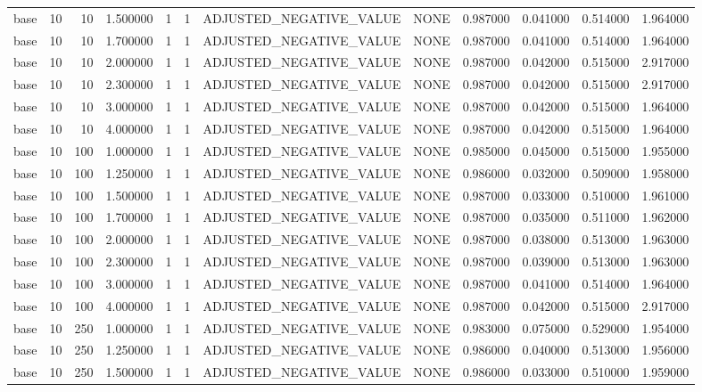 \begin{tabular}{lrrrllllrrrr}
base & 10 & 10 & 1.500000 & 1 & 1 & ADJUSTED_NEGATIVE_VALUE & NONE & 0.987000 & 0.041000 & 0.514000 & 1.964000 \\
base & 10 & 10 & 1.700000 & 1 & 1 & ADJUSTED_NEGATIVE_VALUE & NONE & 0.987000 & 0.041000 & 0.514000 & 1.964000 \\
base & 10 & 10 & 2.000000 & 1 & 1 & ADJUSTED_NEGATIVE_VALUE & NONE & 0.987000 & 0.042000 & 0.515000 & 2.917000 \\
base & 10 & 10 & 2.300000 & 1 & 1 & ADJUSTED_NEGATIVE_VALUE & NONE & 0.987000 & 0.042000 & 0.515000 & 2.917000 \\
base & 10 & 10 & 3.000000 & 1 & 1 & ADJUSTED_NEGATIVE_VALUE & NONE & 0.987000 & 0.042000 & 0.515000 & 1.964000 \\
base & 10 & 10 & 4.000000 & 1 & 1 & ADJUSTED_NEGATIVE_VALUE & NONE & 0.987000 & 0.042000 & 0.515000 & 1.964000 \\
base & 10 & 100 & 1.000000 & 1 & 1 & ADJUSTED_NEGATIVE_VALUE & NONE & 0.985000 & 0.045000 & 0.515000 & 1.955000 \\
base & 10 & 100 & 1.250000 & 1 & 1 & ADJUSTED_NEGATIVE_VALUE & NONE & 0.986000 & 0.032000 & 0.509000 & 1.958000 \\
base & 10 & 100 & 1.500000 & 1 & 1 & ADJUSTED_NEGATIVE_VALUE & NONE & 0.987000 & 0.033000 & 0.510000 & 1.961000 \\
base & 10 & 100 & 1.700000 & 1 & 1 & ADJUSTED_NEGATIVE_VALUE & NONE & 0.987000 & 0.035000 & 0.511000 & 1.962000 \\
base & 10 & 100 & 2.000000 & 1 & 1 & ADJUSTED_NEGATIVE_VALUE & NONE & 0.987000 & 0.038000 & 0.513000 & 1.963000 \\
base & 10 & 100 & 2.300000 & 1 & 1 & ADJUSTED_NEGATIVE_VALUE & NONE & 0.987000 & 0.039000 & 0.513000 & 1.963000 \\
base & 10 & 100 & 3.000000 & 1 & 1 & ADJUSTED_NEGATIVE_VALUE & NONE & 0.987000 & 0.041000 & 0.514000 & 1.964000 \\
base & 10 & 100 & 4.000000 & 1 & 1 & ADJUSTED_NEGATIVE_VALUE & NONE & 0.987000 & 0.042000 & 0.515000 & 2.917000 \\
base & 10 & 250 & 1.000000 & 1 & 1 & ADJUSTED_NEGATIVE_VALUE & NONE & 0.983000 & 0.075000 & 0.529000 & 1.954000 \\
base & 10 & 250 & 1.250000 & 1 & 1 & ADJUSTED_NEGATIVE_VALUE & NONE & 0.986000 & 0.040000 & 0.513000 & 1.956000 \\
base & 10 & 250 & 1.500000 & 1 & 1 & ADJUSTED_NEGATIVE_VALUE & NONE & 0.986000 & 0.033000 & 0.510000 & 1.959000 \\

\end{tabular}
